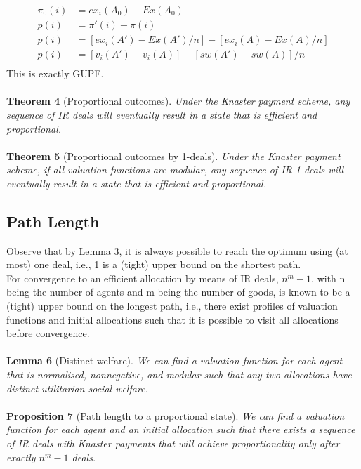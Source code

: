 \documentclass{article}
\begin{document}
\begin{align*}
\pi_{0}(i) &= ex_{i}(A_{0})-Ex(A_{0}) \\
p(i) &= \pi'(i) - \pi(i) \\
p(i) &= [ex_{i}(A') - Ex(A')/n] - [ex_{i}(A) - Ex(A)/n]  \\
p(i) &= [v_{i}(A') - v_{i}(A)] - [sw(A') - sw(A)]/n \\
\end{align*}
This is exactly GUPF.\\
\\
\textbf{Theorem 4} (Proportional outcomes). \textit{Under the Knaster payment scheme, any sequence of IR deals will
eventually result in a state that is efficient and proportional.}\\
\\
\textbf{Theorem 5} (Proportional outcomes by 1-deals). \textit{Under the Knaster payment scheme, if all valuation
functions are modular, any sequence of IR 1-deals will eventually result in a state that is efficient and
proportional.}
\subsection{Path Length}
Observe that by Lemma 3, it is always possible to reach the optimum using (at most) one deal, i.e., 1 is a (tight) upper bound on the shortest path.\\
For convergence to an efficient allocation by means of IR deals, $n^{m}-1$, with n being the number of agents and m being the number of goods, is known to be a (tight) upper bound on the longest path, i.e., there exist profiles of valuation functions and initial allocations such that it is possible to visit all allocations before convergence. \\ \\
\textbf{Lemma 6} (Distinct welfare). \textit{We can find a valuation function for each agent that is normalised, nonnegative,
and modular such that any two allocations have distinct utilitarian social welfare.}\\
\\
\textbf{Proposition 7} (Path length to a proportional state). \textit{We can find a valuation function for each agent and
an initial allocation such that there exists a sequence of IR deals with Knaster payments that will achieve
proportionality only after exactly $n^{m} - 1$ deals.}
\end{document}
